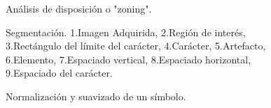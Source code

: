 		\begin{figure}[htbp]
			\centering
			\caption{Análisis de disposición o "zoning".}
			\label{fig: Zoning}
		\end{figure}

		\begin{figure}[htbp]
			\centering
			\caption[Segmentación]{Segmentación. 1.Imagen Adquirida, 2.Región de interés, 3.Rectángulo del límite del carácter, 4.Carácter, 5.Artefacto, 6.Elemento, 7.Espaciado vertical, 8.Espaciado horizontal, 9.Espaciado del carácter.}
			\label{fig: Segmentacion}
		\end{figure}
		
		\begin{figure}[htbp]
			\centering
			\caption{Normalización y suavizado de un símbolo.}
			\label{fig: Normalizacion y Suavizado}
		\end{figure}
	
